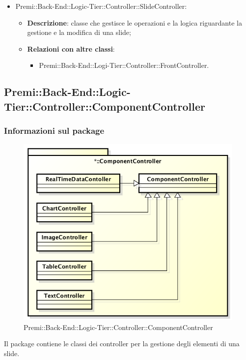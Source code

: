 \begin{itemize}
			\item Premi::Back-End::Logic-Tier::Controller::SlideController:
			\begin{itemize}
				\item \textbf{Descrizione}: classe che gestisce le operazioni e la logica riguardante la gestione e la modifica di una \gls{slide};
				\item \textbf{Relazioni con altre classi}:
				\begin{itemize}
					\item Premi::Back-End::Logi-Tier::Controller::FrontController.
				\end{itemize}
			\end{itemize}
		\end{itemize}
		
\newpage
	
\subsection{Premi::Back-End::Logic-Tier::Controller::ComponentController}
	\subsubsection*{Informazioni sul package}
		\begin{figure}[h]
			\centering
			\includegraphics[width=0.9\linewidth]{img/back-end_logic-tier_controller_componentcontroller}
			\caption[Premi::Back-End::Logic-Tier::Controller::ComponentController]{Premi::Back-End::Logic-Tier::Controller::ComponentController}
		\end{figure}
		Il package contiene le classi dei controller per la gestione degli elementi di una \gls{slide}.
		
